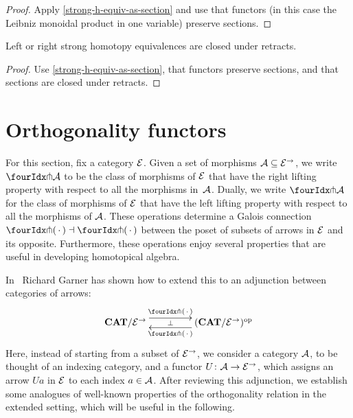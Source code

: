 \documentclass[reqno,10pt,a4paper,oneside]{amsart}
\begin{document}
\begin{proof}
Apply \cref{strong-h-equiv-as-section} and use that functors (in this case the Leibniz monoidal product in one variable) preserve sections.
\end{proof}

\begin{proposition}
\label{strong-h-equiv-closed-under-retract}
Left or right strong homotopy equivalences are closed under retracts.
\end{proposition}

\begin{proof}
Use \cref{strong-h-equiv-as-section},  that functors preserve sections, and that  sections are closed under retracts.
\end{proof}



\section{Orthogonality functors}
\label{sec:ortf}

For this section, fix a category $\catE$. Given a set of morphisms $\cal{A} \subseteq \catE^\to$, we 
write $\liftr{\cal{A}}$ to be the class of morphisms of $\catE$ that have 
the right lifting property with respect to all the morphisms in~$\cal{A}$. Dually, we write $\liftl{\cal{A}}$ for the class of morphisms of $\catE$ that have the left lifting
property with respect to all the morphisms of $\cal{A}$. These operations determine a Galois connection $\liftr{\brarghole} \dashv \liftl{\brarghole}$ between the poset of subsets of arrows in $\catE$ and its opposite. Furthermore, these operations enjoy several properties that are useful in developing homotopical algebra.

\medskip

In~\cite{garner:small-object-argument} Richard Garner has shown how to extend this to an adjunction between categories of arrows:
\begin{equation}
\label{garner-adjunction}
\begin{gathered}
\xymatrix@C+2em{
  \CAT/\catE^{\to}
  \ar@<5pt>[r]^-{\liftl{\brarghole}}
  \ar@{}[r]|-{\bot}
&
  (\CAT/\catE^{\to})^{\op}
  \ar@<5pt>[l]^-{\liftr{\brarghole}}
}
\end{gathered}
\end{equation}
Here, instead of starting from a subset of $\catE^\to$, we consider a category $\cal{A}$, to be thought of an indexing category, and a functor $U \co \cal{A} \to \catE^\to$, which assigns an arrow $U a$ in $\catE$ to each index $a \in \cal{A}$. After reviewing this adjunction, we establish some analogues of well-known properties of the orthogonality relation in the extended setting, which will be useful in the following.
 
\end{document}
